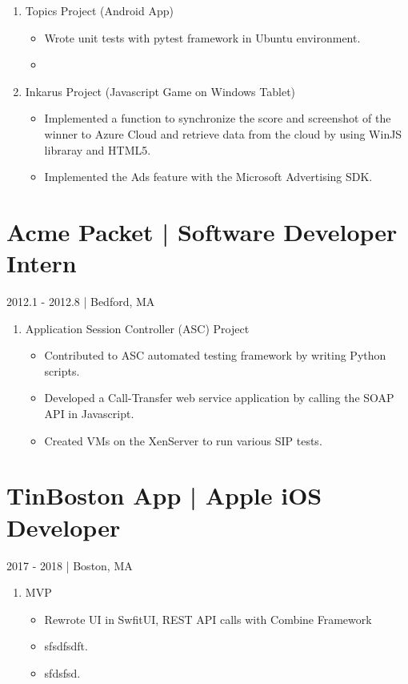 \documentclass[11pt]{article}
\begin{document}
\begin{enumerate}

\item Topics Project (Android App)
\begin{itemize}
    \item Wrote unit tests with pytest framework in Ubuntu environment.
    \item 
\end{itemize}

\item Inkarus Project (Javascript Game on Windows Tablet)
\begin{itemize}
    \item Implemented a function to synchronize the score and screenshot of the winner to Azure Cloud and retrieve data from the cloud by using WinJS libraray and HTML5.
    \item Implemented the Ads feature with the Microsoft Advertising SDK.
\end{itemize}

\end{enumerate}


\section{Acme Packet | Software Developer Intern}
2012.1 - 2012.8 | Bedford, MA

\begin{enumerate}

\item Application Session Controller (ASC) Project
\begin{itemize}
    \item Contributed to ASC automated testing framework by writing Python scripts.
    \item Developed a Call-Transfer web service application by calling the SOAP API in Javascript.
    \item Created VMs on the XenServer to run various SIP tests.
\end{itemize}

\end{enumerate}

\section{TinBoston App | Apple iOS Developer}
2017 - 2018 | Boston, MA

\begin{enumerate}

\item MVP 
\begin{itemize}
    \item Rewrote UI in SwfitUI,  REST API calls with Combine Framework
    \item sfsdfsdft.
    \item sfdsfsd.
\end{itemize}

\end{enumerate}
\end{document}
